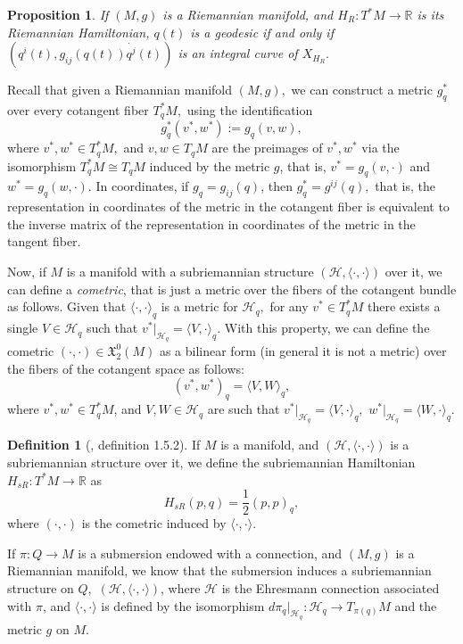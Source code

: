\documentclass[12pt, letterpaper, reqno]{amsart}
\theoremstyle{definition}
\newtheorem{df}{Definition}
\theoremstyle{plain}
\newtheorem{prop}{Proposition}
\theoremstyle{remark}
\begin{document}
\begin{prop}\label{prop:geo}
	If $ (M,g) $ is a Riemannian manifold, and $ H_R: T^*M \rightarrow \mathbb{R} $ is its Riemannian Hamiltonian, $ q(t) $ is a geodesic if and only if $ (q^i(t), g_{ij}(q(t))\dot{q^j}(t)) $ is an integral curve of $ X_{H_R}. $ 
\end{prop}

Recall that given a Riemannian manifold $ (M,g), $ we can construct a metric $ g^*_q $  over every cotangent fiber $ T^*_q M, $ using the identification
$$ g^*_q(v^*,w^*):=g_q(v,w), $$ 
where $ v^*,w^*\in T^*_qM, $ and $ v,w\in T_qM $ are the preimages of $ v^*,w^* $ via the isomorphism $ T^*_qM\cong T_qM $ induced by the metric $ g $, that is, $ v^*=g_q(v,\cdot) $ and $ w^*=g_q(w,\cdot) $. In coordinates, if $ g_q=g_{ij}(q) $, then $ g^*_q=g^{ij}(q), $ that is, the representation in coordinates of the metric in the cotangent fiber is equivalent to the inverse matrix of the representation in coordinates of the metric in the tangent fiber.   

Now, if $ M $ is a manifold with a subriemannian structure $ \left( \mathcal{H}, \langle \cdot,\cdot \rangle \right)  $ over it, we can define a \textit{cometric}, that is just a metric over the fibers of the cotangent bundle as follows. Given that $ \langle \cdot,\cdot \rangle_q $ is a metric for $ \mathcal{H}_q, $ for any $ v^*\in T^*_qM $ there exists a single $ V\in \mathcal{H}_q $ such that $ v^*|_{\mathcal{H}_q} = \langle V,\cdot \rangle_q $. With this property, we can define the cometric $ (\cdot,\cdot)\in \mathfrak{X}_2^0(M) $ as a bilinear form (in general it is not a metric) over the fibers of the cotangent space as follows:
$$ (v^*,w^*)_q= \langle V,W \rangle_q, $$ 
where $ v^*,w^*\in T^*_qM $, and $ V,W\in \mathcal{H}_q $ are such that $ v^*|_{\mathcal{H}_q}= \langle V,\cdot \rangle_q, $ $ w^*|_{\mathcal{H}_q}= \langle W,\cdot \rangle_q. $ 
\begin{df}[\cite{montgomery2002tour}, definition 1.5.2]
	If $ M $ is a manifold, and $ \left( \mathcal{H}, \langle\cdot,\cdot\rangle \right) $ is a subriemannian structure over it, we define the subriemannian Hamiltonian $ H_{sR}: T^*M \rightarrow \mathbb{R} $ as $$ H_{sR}(p,q)= \frac{1}{2} (p,p)_q, $$   	
	where $ (\cdot,\cdot) $ is the cometric induced by $ \langle\cdot,\cdot\rangle. $ 
\end{df}
If $ \pi: Q \rightarrow M $ is a submersion endowed with a connection, and $ (M,g) $ is a Riemannian manifold, we know that the submersion induces a subriemannian structure on $ Q, $ $ (\mathcal{H},\langle\cdot,\cdot\rangle) $, where $ \mathcal{H} $ is the Ehresmann connection associated with $ \pi $, and $ \langle\cdot,\cdot\rangle $ is defined by the isomorphism $ d\pi_q|_{\mathcal{H}_q}: \mathcal{H}_q \rightarrow T_{\pi(q)}M $ and the metric $ g $ on $ M. $ 
\end{document}
